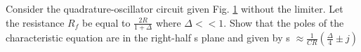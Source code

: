 Consider the quadrature-oscillator circuit given Fig. \ref{fig:es17btech11009_fig1} without the limiter. Let the resistance $R_{f}$ be equal to $\frac{2R}{1 + \Delta}$ where $\Delta << 1$. Show that the poles of the characteristic equation are in the right-half s plane and given by 
s $\approx \frac{1}{CR}(\frac{\Delta}{4}\pm j)$

\begin{figure}[!ht]
\begin{center}
\resizebox{\columnwidth}{!}{}
\end{center}
\caption{}
\label{fig:es17btech11009_fig1}
\end{figure}

